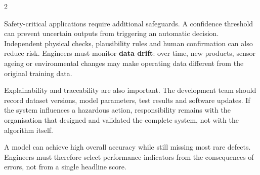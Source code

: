 \begin{multicols}{2}
\begin{ecarticle}
Safety-critical applications require additional safeguards. A confidence threshold can prevent uncertain outputs from triggering an automatic decision. Independent physical checks, plausibility rules and human confirmation can also reduce risk. Engineers must monitor \textbf{data drift}: over time, new products, sensor ageing or environmental changes may make operating data different from the original training data.

Explainability and traceability are also important. The development team should record dataset versions, model parameters, test results and software updates. If the system influences a hazardous action, responsibility remains with the organisation that designed and validated the complete system, not with the algorithm itself.
\end{ecarticle}

\begin{tcolorbox}[title=\sffamily\bfseries Engineering Insight,colback=yellow!10,colframe=ECOrange]
A model can achieve high overall accuracy while still missing most rare defects. Engineers must therefore select performance indicators from the consequences of errors, not from a single headline score.
\end{tcolorbox}

\columnbreak


\end{multicols}

